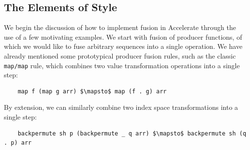 \subsection{The Elements of Style}
\label{sec:elements_of_style}

We begin the discussion of how to implement fusion in Accelerate through the use
of a few motivating examples. We start with fusion of producer functions, of
which we would like to fuse arbitrary sequences into a single operation. We have
already mentioned some prototypical producer fusion rules, such as the classic
\texttt{map/map} rule, which combines two value transformation operations into a
single step:
%
\begin{lstlisting}[style=haskell,numbers=none,mathescape]
%\bf$\langle$ RULE: map/map $\rangle$%
    map f (map g arr) $\mapsto$ map (f . g) arr
\end{lstlisting}
%
By extension, we can similarly combine two index space transformations into a
single step:
%
\begin{lstlisting}[style=haskell,numbers=none,mathescape]
%\bf$\langle$ RULE: backpermute/backpermute $\rangle$%
    backpermute sh p (backpermute _ q arr) $\mapsto$ backpermute sh (q . p) arr
\end{lstlisting}

